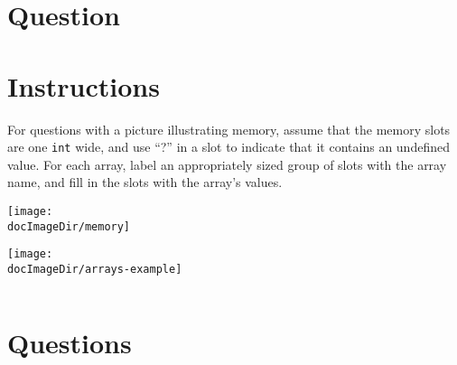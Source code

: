 \newpage


\def\memoryImage{%
  \par\medskip\texttt{[image: \\docImageDir/memory]}%
}

\section{Question}

\section*{Instructions}

For questions with a picture illustrating memory, assume that the memory slots
are one \texttt{int} wide, and use ``?'' in a slot to indicate that it
contains an undefined value.  For each array, label an appropriately sized
group of slots with the array name, and fill in the slots with the array's
values.

\vspace{2.7ex}
\begin{minipage}[t]{0.5\linewidth} \vspace{0ex}
  \vspace{-2.7ex}
  \memoryImage
  \par
  \vspace{-0.63in}
  \hspace{0.45in}
  \texttt{[image: \\docImageDir/arrays-example]}
\end{minipage}
\begin{minipage}[t]{0.5\linewidth} \vspace{0ex}
  \inputminted{cpp}{\docCodeDir/.arrays-example.cpp.gen.section.array}
\end{minipage}

\section*{Questions}

